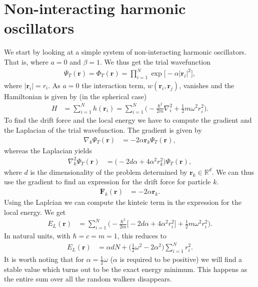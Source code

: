 \documentclass[
    a4paper, aps, twocolumn, floatfix, superscriptaddress, nofootinbib]{revtex4-1}
\newcommand{\vf}{\mathbf}
\newcommand{\1}{\mathds{1}}
\newcommand{\half}{\frac{1}{2}}
\begin{document}
\section{Non-interacting harmonic oscillators}
    We start by looking at a simple system of non-interacting harmonic
    oscillators. That is, where $a = 0$ and $\beta = 1$. We thus get the trial
    wavefunction
    \begin{align}
        \Psi_T(\vf{r})
        = \Phi_T(\vf{r})
        = \prod_{i = 1}^N \exp\bigl[
            -\alpha |\vf{r}_i|^2
        \bigr],
    \end{align}
    where $|\vf{r}_i| = r_i$. As $a = 0$ the interaction term,
    $w(\vf{r}_i, \vf{r}_j)$, vanishes and the Hamiltonian is given by
    (in the spherical case)
    \begin{align}
        H &= \sum_{i = 1}^N h(\vf{r}_i)
        = \sum_{i = 1}^N \Biggl(
            -\frac{\hbar^2}{2m}\nabla_i^2
            + \half m \omega^2 r_i^2
        \Biggr).
    \end{align}
    To find the drift force and the local energy we have to compute the gradient
    and the Laplacian of the trial wavefunction. The gradient is given by
    \begin{align}
        \nabla_k\Psi_T(\vf{r})
        &= -2\alpha \vf{r}_k\Psi_T(\vf{r}),
    \end{align}
    whereas the Laplacian yields
    \begin{align}
        \nabla^2_k\Psi_T(\vf{r})
        &= \big(-2d\alpha + 4\alpha^2 r_k^2\bigr)\Psi_T(\vf{r}),
    \end{align}
    where $d$ is the dimensionality of the problem determined by
    $\vf{r}_k \in \mathbb{R}^d$. We can thus use the gradient to find an
    expression for the drift force for particle $k$.
    \begin{align}
        \vf{F}_k(\vf{r})
        &= -2\alpha\vf{r}_k.
    \end{align}
    Using the Laplcian we can compute the kinteic term in the expression for the
    local energy. We get
    \begin{align}
        E_L(\vf{r})
        &=
        \sum_{i = 1}^N
        \Biggl(
            -\frac{\hbar^2}{2m}
            \bigl[
                -2d\alpha + 4\alpha^2 r_i^2
            \bigr]
            + \half m\omega^2 r_i^2
        \Biggr).
    \end{align}
    In natural units, with $\hbar = c = m = 1$, this reduces to
    \begin{align}
        E_L(\vf{r})
        &=
        \alpha dN
        + \biggl(
            \half\omega^2
            - 2\alpha^2
        \biggr)
        \sum_{i = 1}^N r_i^2.
        \label{eq:closed_form_natural_units_local_energy}
    \end{align}
    It is worth noting that for $\alpha = \half\omega$ ($\alpha$ is required to
    be positive) we will find a stable value which turns out to be the exact
    energy minimum. This happens as the entire sum over all the random walkers
    disappears.
\end{document}
